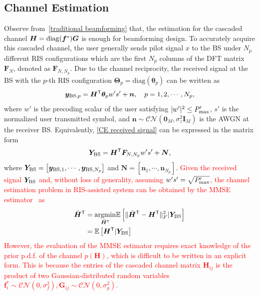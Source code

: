 \documentclass[journal,twocolumn]{IEEEtran}
\theoremstyle{nonumberplain}
\def \T {\bm \Theta}
\def \diag {\text{diag}}
\def \T {^{\mathsf{T}}}
\newcommand{\red}[1]{\textcolor{red}{#1}}
\begin{document}
\subsection{Channel Estimation}
\label{Channel Estimation}
    Observe from~\eqref{traditional beamforming} that, the estimation for the cascaded channel ${\bm H} = {\rm diag}({\bm f}^{*})\bm G$ is enough for beamforming design. 
    To accurately acquire this cascaded channel, the user generally sends pilot signal $x$ to the BS under $N_p$ different RIS configurations which are the first $N_p$ columns of the DFT matrix ${\bm F}_N$, denoted as $\bm F_{N,N_p}$. 
    Due to the channel reciprocity, the received signal at the BS with the $p$-th RIS configuration $\bm \Theta_{p}=\diag({\bm \theta}_p)$ can be written as~\cite{atapattu2020reconfigurable}
    \begin{equation}
    \label{CE received signal}
        {\bm y}_{{\rm BS}, p} =\bm H\T {\bm \theta}_p w' s'+\bm n,\quad p=1,2,\cdots,N_p,
    \end{equation}
    where $w'$ is the precoding scalar of the user satisfying $|w'|^2 \leq P_{\rm max}'$, $s'$ is the normalized user transmitted symbol, and $\bm n\sim \mathcal{CN}\left( \bm 0_{M}, \sigma_{z}^{2}\bm I_{M}\right)$ is the \ac{AWGN} at the receiver BS.
    Equivalently, \eqref{CE received signal} can be expressed in the matrix form
    \begin{equation}
    \label{eqn:LS_CE model}
        {\bm Y}_{\rm BS}=\bm H\T \bm F_{N,N_p}w' s' + {\bm N},
    \end{equation}
    where ${\bm Y}_{\rm BS}=\left[\bm y_{{\rm BS}, 1},\cdots,\bm y_{{\rm BS}, N_p}\right]$ and $\bm N = \left[ \bm n_{1},\cdots,\bm n_{N_p}\right]$.
    \red{Given the received signal $\bm Y_{\rm BS}$ and, without loss of generality, assuming $w's'=\sqrt{P'_{\rm max}}$, the channel estimation problem in RIS-assisted system can be obtained by the MMSE estimator~\cite{kundu2021channel} as  
    \begin{equation}
        \begin{aligned}
            \hat{\bm H}\T &= \underset{\hat{\bm H}\T}{\rm argmin}\mathbb{E}\left[\|\hat{\bm H}\T - {\bm H}\T\|_{F}^2 | {\bm Y}_{\rm BS}\right]\\
            &= \mathbb{E}\left[ {\bm H}\T | {\bm Y}_{\rm BS} \right] 
        \end{aligned} 
        \label{eqn:MMSE_H}
    \end{equation}
    However, the evaluation of the MMSE estimator requires exact knowledge of the prior p.d.f. of the channel $p({\bm H})$, which is difficult to be written in an explicit form. This is because the entries of the cascaded channel matrix ${\bm H}_{ij}$ is the product of two Gaussian-distributed random variables ${\bm f}_i^{*}\sim{\mathcal{CN}}(0,\sigma_f^2), {\bm G}_{ij}\sim{\mathcal{CN}}(0,\sigma_g^2)$. }
\end{document}
